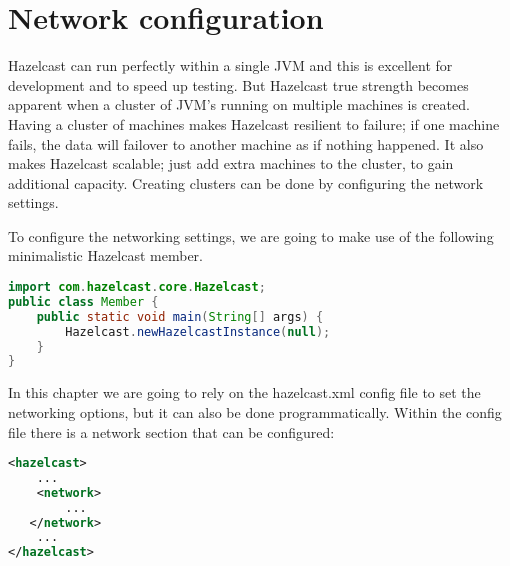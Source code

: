 \chapter{Network configuration}

Hazelcast can run perfectly within a single JVM and this is excellent for development and to speed up testing. But Hazelcast true strength becomes apparent when a cluster of JVM's running on multiple machines is created. Having a cluster of machines makes Hazelcast resilient to failure; if one machine fails, the data will failover to another machine as if nothing happened. It also makes Hazelcast scalable; just add extra machines to the cluster, to gain additional capacity. Creating clusters can be done by configuring the network settings.

To configure the networking settings, we are going to make use of the following minimalistic Hazelcast member.
\begin{lstlisting}[language=java]
import com.hazelcast.core.Hazelcast;
public class Member {
    public static void main(String[] args) {
        Hazelcast.newHazelcastInstance(null);
    }
}
\end{lstlisting}

In this chapter we are going to rely on the hazelcast.xml config file to set the networking options, but it can also be done programmatically. Within the config file there is a network section that can be configured:
\begin{lstlisting}[language=xml]
<hazelcast>
    ...
    <network>
        ...  
   </network>
    ...
</hazelcast>
\end{lstlisting}

